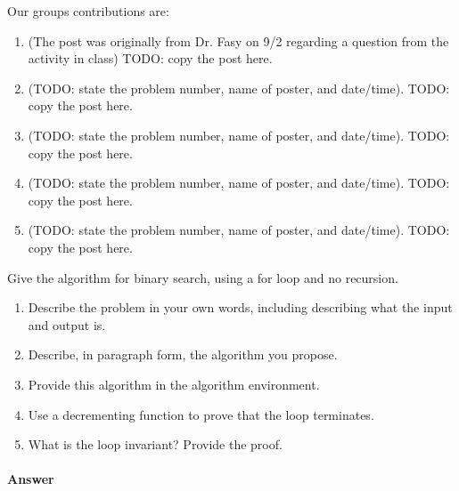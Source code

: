 \documentclass{article}
\begin{document}
Our groups contributions are:
\begin{enumerate}
	\item (The post was originally from Dr. Fasy on 9/2 regarding a question from the activity in class) TODO:
        copy the post here.
    \item (TODO: state the problem number, name of poster, and date/time). TODO:
        copy the post here.
    \item (TODO: state the problem number, name of poster, and date/time). TODO:
        copy the post here.
    \item (TODO: state the problem number, name of poster, and date/time). TODO:
        copy the post here.
    \item (TODO: state the problem number, name of poster, and date/time). TODO:
        copy the post here.
\end{enumerate}


\nextprob
{}

Give the algorithm for binary search, using a for loop and no recursion.

\begin{enumerate}
    \item Describe the problem in your own words, including
        describing what the input and output is.
    \item Describe, in paragraph form, the algorithm you propose.
    \item Provide this algorithm in the algorithm environment.
    \item Use a decrementing function to prove that the loop terminates.
    \item What is the loop invariant? Provide the proof.
\end{enumerate}

\paragraph{Answer}

\end{document}
